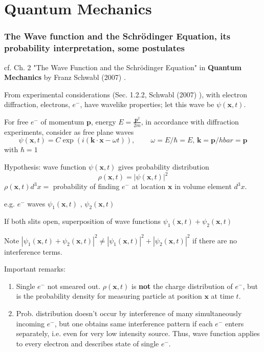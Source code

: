 \part{Quantum Mechanics}


\section{The Wave function and the Schr\"{o}dinger Equation, its probability interpretation, some postulates}

cf. Ch. 2 "The Wave Function and the Schr\"{o}dinger Equation" in \textbf{Quantum Mechanics} by Franz Schwabl (2007) \cite{agat:FrSc2007}.

From experimental considerations (Sec. 1.2.2, Schwabl (2007) \cite{agat:FrSc2007}), with electron diffraction, electrons, $e^-$, have wavelike properties; let this wave be $\psi(\mathbf{x}, t)$. 

For free $e^-$ of momentum $\mathbf{p}$, energy $E = \frac{ \mathbf{p}^2}{2m}$, in accordance with diffraction experiments, consider as free plane waves 
\[
\psi(\mathbf{x}, t) = C \exp{ \left( i ( \mathbf{k} \cdot \mathbf{x} - \omega t)\right)}, \qquad \, \omega = E / \hbar = E, \, \mathbf{k} = \mathbf{p}/ hbar = \mathbf{p}
\]
with $\hbar = 1$

Hypothesis: wave function $\psi(\mathbf{x},t)$ gives probability distribution 
\[
\rho(\mathbf{x}, t) = | \psi(\mathbf{x}, t)|^2
\]
$\rho(\mathbf{x}, t) d^3 x = $ probability of finding $e^-$ at location $\mathbf{x}$ in volume element $d^3x$.

e.g. $e^-$ waves $\psi_1(\mathbf{x}, t)$ , $\psi_2(\mathbf{x},t)$

If both slits open, superposition of wave functions $\psi_1(\mathbf{x}, t) + \psi_2(\mathbf{x},t)$

Note $| \psi_1(\mathbf{x},t) + \psi_2(\mathbf{x},t) |^2 \neq | \psi_1(\mathbf{x},t) |^2 + |\psi_2(\mathbf{x},t) |^2$ if there are no interference terms.

Important remarks: 

\begin{enumerate}
	\item[(i)] Single $e^-$ not smeared out. $\rho(\mathbf{x},t)$ is \textbf{not} the charge distribution of $e^-$, but is the probability density for measuring particle at position $\mathbf{x}$ at time $t$.
	\item[(ii)] Prob. distribution doesn't occur by interference of many simultaneously incoming $e^-$, but one obtains same interference pattern if each $e^-$ enters separately, i.e. even for very low intensity source. Thus, wave function applies to every electron and describes state of single $e^-$.
\end{enumerate}

